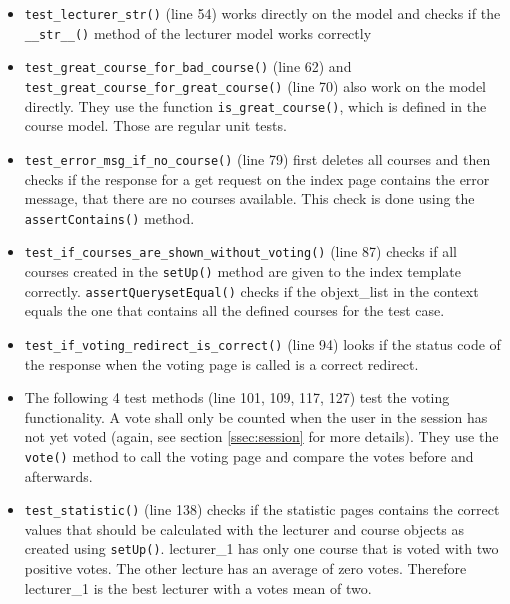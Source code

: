 \begin{itemize}
 \item \lstinline|test_lecturer_str()| (line 54) works directly on the model and checks if the \lstinline|__str__()| method of the lecturer model works correctly
 \item \lstinline|test_great_course_for_bad_course()| (line 62) and \lstinline|test_great_course_for_great_course()| (line 70) also work on the model directly. They use the function \lstinline|is_great_course()|, which is defined in the course model. Those are regular unit tests.
 \item \lstinline|test_error_msg_if_no_course()| (line 79) first deletes all courses and then checks if the response for a get request on the index page contains the error message, that there are no courses available. This check is done using the \lstinline|assertContains()| method.
 \item \lstinline|test_if_courses_are_shown_without_voting()| (line 87) checks if all courses created in the \lstinline|setUp()| method are given to the index template correctly. \lstinline|assertQuerysetEqual()| checks if the objext\_list in the context equals the one that contains all the defined courses for the test case.
 \item \lstinline|test_if_voting_redirect_is_correct()| (line 94) looks if the status code of the response when the voting page is called is a correct redirect.
 \item The following 4 test methods (line 101, 109, 117, 127) test the voting functionality. A vote shall only be counted when the user in the session has not yet voted (again, see section \ref{ssec:session} for more details). They use the \lstinline|vote()| method to call the voting page and compare the votes before and afterwards.
 \item \lstinline|test_statistic()| (line 138) checks if the statistic pages contains the correct values that should be calculated with the lecturer and course objects as created using \lstinline|setUp()|. lecturer\_1 has only one course that is voted with two positive votes. The other lecture has an average of zero votes. Therefore lecturer\_1 is the best lecturer with a votes mean of two.
\end{itemize}


